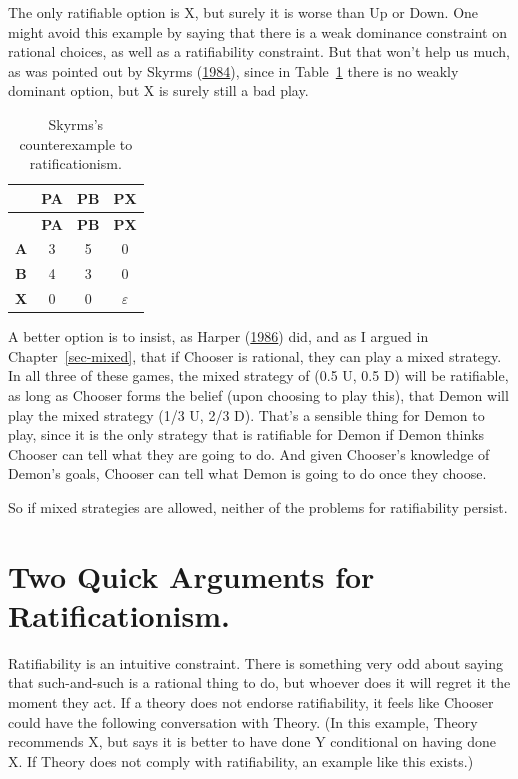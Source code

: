 \documentclass[
  12pt,
  letterpaper,
  DIV=11,
  numbers=noendperiod]{scrreprt}
\begin{document}
The only ratifiable option is X, but surely it is worse than Up or Down.
One might avoid this example by saying that there is a weak dominance
constraint on rational choices, as well as a ratifiability constraint.
But that won't help us much, as was pointed out by Skyrms
(\protect\hyperlink{ref-Skyrms1984}{1984}), since in
Table~\ref{tbl-verybad-third} there is no weakly dominant option, but X
is surely still a bad play.

\hypertarget{tbl-verybad-third}{}
\begin{longtable}[]{@{}cccc@{}}
\caption{\label{tbl-verybad-third}Skyrms's counterexample to
ratificationism.}\tabularnewline
\toprule\noalign{}
& \textbf{PA} & \textbf{PB} & \textbf{PX} \\
\midrule\noalign{}
\endfirsthead
\toprule\noalign{}
& \textbf{PA} & \textbf{PB} & \textbf{PX} \\
\midrule\noalign{}
\endhead
\bottomrule\noalign{}
\endlastfoot
\textbf{A} & 3 & 5 & 0 \\
\textbf{B} & 4 & 3 & 0 \\
\textbf{X} & 0 & 0 & \(\varepsilon\) \\
\end{longtable}

A better option is to insist, as Harper
(\protect\hyperlink{ref-Harper1986}{1986}) did, and as I argued in
Chapter~\ref{sec-mixed}, that if Chooser is rational, they can play a
mixed strategy. In all three of these games, the mixed strategy of (0.5
U, 0.5 D) will be ratifiable, as long as Chooser forms the belief (upon
choosing to play this), that Demon will play the mixed strategy (1/3 U,
2/3 D). That's a sensible thing for Demon to play, since it is the only
strategy that is ratifiable for Demon if Demon thinks Chooser can tell
what they are going to do. And given Chooser's knowledge of Demon's
goals, Chooser can tell what Demon is going to do once they choose.

So if mixed strategies are allowed, neither of the problems for
ratifiability persist.

\hypertarget{two-quick-arguments-for-ratificationism.}{%
\section{Two Quick Arguments for
Ratificationism.}\label{two-quick-arguments-for-ratificationism.}}

Ratifiability is an intuitive constraint. There is something very odd
about saying that such-and-such is a rational thing to do, but whoever
does it will regret it the moment they act. If a theory does not endorse
ratifiability, it feels like Chooser could have the following
conversation with Theory. (In this example, Theory recommends X, but
says it is better to have done Y conditional on having done X. If Theory
does not comply with ratifiability, an example like this exists.)
\end{document}
